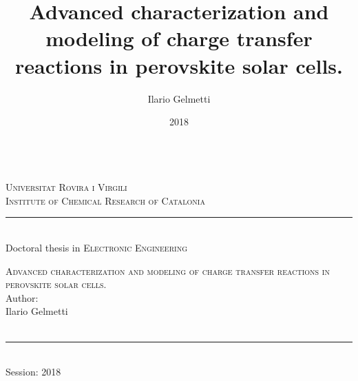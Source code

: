 \documentclass[a4paper, 12pt, openright]{book}
\title{Advanced characterization and modeling of charge transfer reactions in perovskite solar cells.}
\author{Ilario Gelmetti}
\date{2018}
\begin{document}
\pagestyle{plain}

\frontmatter

{\let\cleardoublepage\clearpage %

\begin{titlepage}\begin{center}



	\\%
	\bigskip
	\large{\textsc{Universitat Rovira i Virgili\\ Institute of Chemical Research of Catalonia}}\\
		\rule{5cm}{1pt}\\
	{
\smallskip
	{Doctoral thesis in \textsc{Electronic Engineering}}}\\
\vfill

	\huge{\textsc{Advanced characterization and modeling of charge transfer reactions in perovskite solar cells.}}\\
\vfill
	\footnotesize{Author:}\\
	\large{Ilario Gelmetti}\\
		\makebox[.2\textwidth]{\rule{0pt}{.02\textheight}}\\
\end{center}
\begin{small}
\bigskip\bigskip\bigskip\bigskip
	\begin{center}
	\rule{3cm}{1pt}\\
	Session: 2018\\
	\end{center}
\end{small}
\end{titlepage}

}
\end{document}
